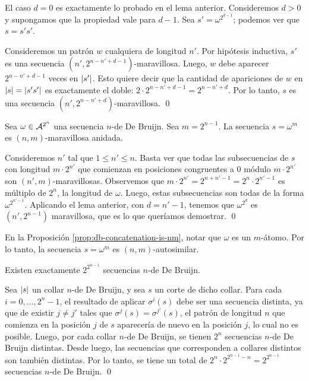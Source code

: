 \begin{demo}
  El caso $d = 0$ es exactamente lo probado en el lema anterior.
  Consideremos $d > 0$ y supongamos que la propiedad vale para $d - 1$.
  Sea $s' = \omega^{2^{d-1}}$; podemos ver que $s = s's'$.

  Consideremos un patrón $w$ cualquiera de longitud $n'$. Por hipótesis
  inductiva, $s'$ es una secuencia $(n',2^{n-n'+d-1})$-maravillosa. Luego, $w$
  debe aparecer $2^{n-n'+d-1}$ veces en $\left\vert s'\right\vert$.
  Esto quiere decir que la cantidad de apariciones de $w$ en $\left\vert s\right\vert =
    \left\vert s's'\right\vert$ es exactamente el doble: $2 \cdot 2^{n-n'+d-1} = 2^{n-n'+d}$.
  Por lo tanto, $s$ es una secuencia $(n',2^{n-n'+d})$-maravillosa. \qed
\end{demo}

\begin{prop}
  \label{prop:db-concatenation-is-nm}
  Sea $\omega \in \mathcal{A}^{2^n}$ una secuencia $n$-de De Bruijn.
  Sea $m = 2^{n-1}$. La secuencia $s = \omega^{m}$ es $(n,m)$-maravillosa
  anidada.
\end{prop}

\begin{demo}
  Consideremos $n'$ tal que $1 \leq n' \leq n$. Basta ver que todas las
  subsecuencias de $s$ con longitud $m \cdot 2^{n'}$ que comienzan en
  posiciones congruentes a $0$ módulo $m \cdot 2^{n'}$ son
  $(n',m)$-maravillosas. Observemos que $m \cdot 2^{n'} = 2^{n+n'-1} = 2^n
    \cdot 2^{n'-1}$ es múltiplo de $2^n$, la longitud de $\omega$.
  Luego, estas subsecuencias son todas de la forma $\omega^{2^{n'-1}}$.
  Aplicando el lema anterior, con $d = n'-1$, tenemos que $\omega^{2^d}$
  es $(n',2^{n-1})$ maravillosa, que es lo que queríamos demostrar. \qed
\end{demo}

\begin{obs}
  En la Proposición \ref{prop:db-concatenation-is-nm}, notar que $\omega$ es un
  $m$-átomo. Por lo tanto, la secuencia $s = \omega^m$ es $(n,m)$-autosimilar.
\end{obs}

\begin{lema}
  \label{lema:db-sequence-count}
  Existen exactamente $2^{2^{n-1}}$ secuencias $n$-de De Bruijn.
\end{lema}

\begin{demo}
  Sea $\left\vert s\right\vert$ un collar $n$-de De Bruijn, y sea $s$ un corte de dicho
  collar. Para cada $i = 0,\dots,2^n-1$, el resultado de aplicar $\sigma^i(s)$
  debe ser una secuencia distinta, ya que de existir $j \neq j'$ tales que
  $\sigma^j(s) = \sigma^{j'}(s)$, el patrón de longitud $n$ que comienza en la
  posición $j$ de $s$ aparecería de nuevo en la posición $j$, lo cual no es
  posible. Luego, por cada collar $n$-de De Bruijn, se tienen $2^n$ secuencias
  $n$-de De Bruijn distintas. Desde luego, las secuencias que corresponden a
  collares distintos son también distintas. Por lo tanto, se tiene un total de
  $2^n \cdot 2^{2^{n-1}-n} = 2^{2^{n-1}}$ secuencias $n$-de De Bruijn. \qed
\end{demo}

